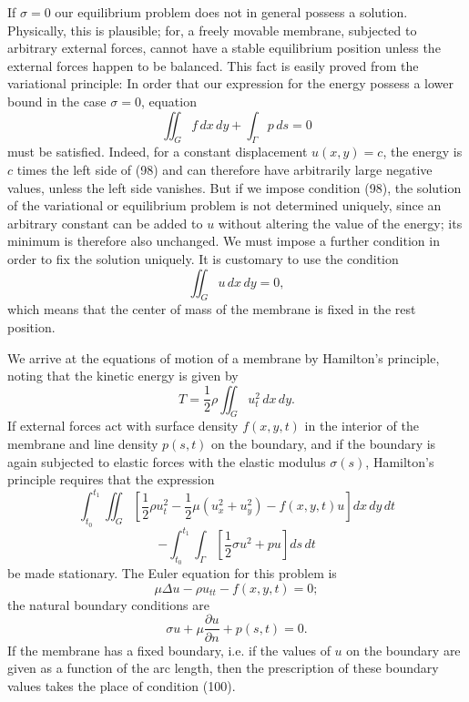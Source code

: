 If $\sigma=0$ our equilibrium problem does not in general possess a solution. Physically, this is plausible; for, a freely movable membrane, subjected to arbitrary external forces, cannot have a stable equilibrium position unless the external forces happen to be balanced. This fact is easily proved from the variational principle: In order that our expression for the energy possess a lower bound in the case $\sigma=0$, equation
\begin{equation}\tag{98}
\iint_G f\,dx\,dy+\int_\Gamma p\,ds=0
\end{equation}
must be satisfied. Indeed, for a constant displacement $u(x,y)=c$, the energy is $c$ times the left side of (98) and can therefore have arbitrarily large negative values, unless the left side vanishes. But if we impose condition (98), the solution of the variational or equilibrium problem is not determined uniquely, since an arbitrary constant can be added to $u$ without altering the value of the energy; its minimum is therefore also unchanged. We must impose a further condition in order to fix the solution uniquely. It is customary to use the condition
\[
\iint_Gu\,dx\,dy=0,
\]
which means that the center of mass of the membrane is fixed in the rest position.

We arrive at the equations of motion of a membrane by Hamilton's principle, noting that the kinetic energy is given by
\begin{equation}\tag{99}
T=\frac12\rho\iint_Gu_t^2\,dx\,dy.
\end{equation}
If external forces act with surface density $f(x,y,t)$ in the interior of the membrane and line density $p(s,t)$ on the boundary, and if the boundary is again subjected to elastic forces with the elastic modulus $\sigma(s)$, Hamilton's principle requires that the expression
\[
\int_{t_0}^{t_1}\iint_G\left[\frac12\rho u_t^2-\frac12\mu(u_x^2+u_y^2)-f(x,y,t)u\right]dx\,dy\,dt
\]
\[
-\int_{t_0}^{t_1}\int_\Gamma\left[\frac12\sigma u^2+pu\right]ds\,dt
\]
be made stationary. The Euler equation for this problem is
\[
\mu\Delta u-\rho u_{tt}-f(x,y,t)=0;
\]
the natural boundary conditions are
\begin{equation}\tag{100}
\sigma u+\mu\frac{\partial u}{\partial n}+p(s,t)=0.
\end{equation}
If the membrane has a fixed boundary, i.e. if the values of $u$ on the boundary are given as a function of the arc length, then the prescription of these boundary values takes the place of condition (100).

